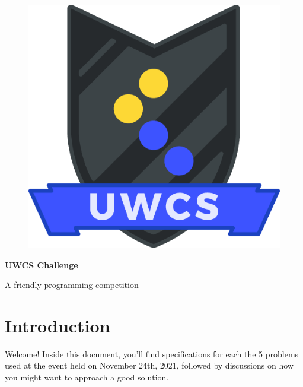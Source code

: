 \documentclass[a4paper,12pt,parskip=half-]{scrartcl}
\begin{document}
\begin{figure}
    \vspace{-10pt} %
    \includegraphics[width=0.8\linewidth]{shield.png} %
    \vspace{-100pt} %
\end{figure}

\normalfont \Huge \bfseries UWCS Challenge

\normalfont\Large A friendly programming competition
\normalsize

\section*{Introduction}

Welcome! 
Inside this document, you'll find specifications for each the 5 problems used at the event held on November 24th, 2021, 
followed by discussions on how you might want to approach a good solution.

\tableofcontents

\newpage



\newpage

\newpage

\newpage

\newpage






% 
% 
% 
% 
% 
\end{document}
